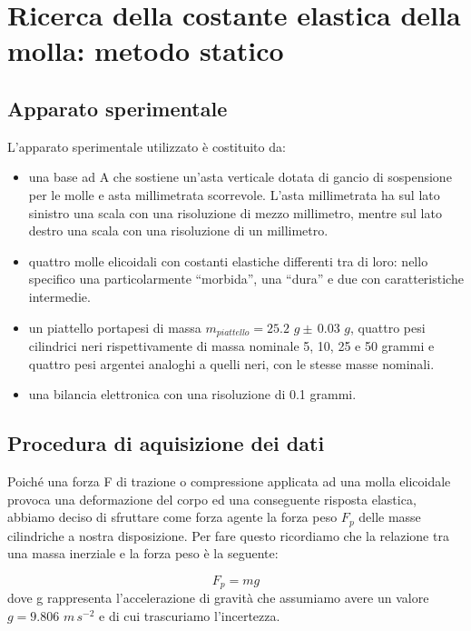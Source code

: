
\section{Ricerca della costante elastica della molla: metodo statico}

\subsection{Apparato sperimentale}
L'apparato sperimentale utilizzato è costituito da:
	\begin{itemize}
		\item{una base ad A che sostiene un'asta verticale dotata di gancio di sospensione
            per le molle e asta millimetrata scorrevole. L'asta millimetrata ha sul lato sinistro
            una scala con una risoluzione di mezzo millimetro, mentre sul lato destro una scala con
            una risoluzione di un millimetro.}
		\item{quattro molle elicoidali con costanti elastiche differenti tra di loro: nello specifico
            una particolarmente ``morbida'', una ``dura'' e due con caratteristiche intermedie.}
		\item{un piattello portapesi di massa $m_{piattello} = 25.2\,\,g \pm\, 0.03\,\,g$, quattro pesi
            cilindrici neri rispettivamente di massa nominale 5, 10, 25 e 50 grammi e quattro pesi argentei
            analoghi a quelli neri, con le stesse masse nominali.}
        \item{una bilancia elettronica con una risoluzione di 0.1 grammi.}
	\end{itemize}

\subsection{Procedura di aquisizione dei dati}

Poiché una forza F di trazione o compressione applicata ad una molla elicoidale provoca una deformazione del corpo ed una conseguente risposta elastica, abbiamo deciso di sfruttare come forza agente la forza peso $F_{p}$ delle masse cilindriche a nostra disposizione. Per fare questo ricordiamo che la relazione tra una massa inerziale e la forza peso è la seguente:

\begin{equation}
	F_{p} = mg
    \label{eq:fp}
\end{equation}
%
dove g rappresenta l'accelerazione di gravità che assumiamo avere un valore $g = 9.806\,\,m\,s^{-2}$ e di cui trascuriamo l'incertezza.

